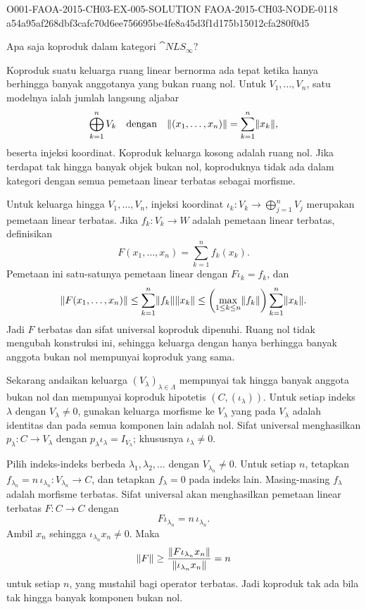 \begin{o001solution}
  {O001-FAOA-2015-CH03-EX-005-SOLUTION}
  {FAOA-2015-CH03-NODE-0118}
  {a54a95af268dbf3cafc70d6ee756695be4fe8a45d3f1d175b15012cfa280f0d5}
\begin{o001statement}
Apa saja koproduk dalam kategori $\cat{NLS_{\boldsymbol\infty}}$?
\end{o001statement}
\begin{o001answer}
Koproduk suatu keluarga ruang linear bernorma ada tepat ketika hanya
berhingga banyak anggotanya yang bukan ruang nol. Untuk
$V_1,\ldots,V_n$, satu modelnya ialah jumlah langsung aljabar
\[
\bigoplus_{k=1}^nV_k
\quad\text{dengan}\quad
\lVert(x_1,\ldots,x_n)\rVert=\sum_{k=1}^n\lVert x_k\rVert,
\]
beserta injeksi koordinat. Koproduk keluarga kosong adalah ruang nol.
Jika terdapat tak hingga banyak objek bukan nol, koproduknya tidak ada dalam
kategori dengan semua pemetaan linear terbatas sebagai morfisme.
\end{o001answer}
\begin{o001proof}
Untuk keluarga hingga $V_1,\ldots,V_n$, injeksi koordinat
$\iota_k\colon V_k\to\bigoplus_{j=1}^nV_j$ merupakan pemetaan linear
terbatas. Jika $f_k\colon V_k\to W$ adalah pemetaan linear terbatas,
definisikan
\[
F(x_1,\ldots,x_n)=\sum_{k=1}^nf_k(x_k).
\]
Pemetaan ini satu-satunya pemetaan linear dengan $F\iota_k=f_k$, dan
\[
\lVert F(x_1,\ldots,x_n)\rVert
\le\sum_{k=1}^n\lVert f_k\rVert\lVert x_k\rVert
\le\left(\max_{1\le k\le n}\lVert f_k\rVert\right)
   \sum_{k=1}^n\lVert x_k\rVert.
\]
Jadi $F$ terbatas dan sifat universal koproduk dipenuhi. Ruang nol tidak
mengubah konstruksi ini, sehingga keluarga dengan hanya berhingga banyak
anggota bukan nol mempunyai koproduk yang sama.

Sekarang andaikan keluarga $(V_\lambda)_{\lambda\in\Lambda}$ mempunyai tak
hingga banyak anggota bukan nol dan mempunyai koproduk hipotetis
$(C,(\iota_\lambda))$. Untuk setiap indeks $\lambda$ dengan
$V_\lambda\ne0$, gunakan keluarga morfisme ke $V_\lambda$ yang pada
$V_\lambda$ adalah identitas dan pada semua komponen lain adalah nol.
Sifat universal menghasilkan $p_\lambda\colon C\to V_\lambda$ dengan
$p_\lambda\iota_\lambda=I_{V_\lambda}$; khususnya
$\iota_\lambda\ne0$.

Pilih indeks-indeks berbeda $\lambda_1,\lambda_2,\ldots$ dengan
$V_{\lambda_n}\ne0$. Untuk setiap $n$, tetapkan
$f_{\lambda_n}=n\,\iota_{\lambda_n}\colon V_{\lambda_n}\to C$, dan tetapkan
$f_\lambda=0$ pada indeks lain. Masing-masing $f_\lambda$ adalah morfisme
terbatas. Sifat universal akan menghasilkan pemetaan linear terbatas
$F\colon C\to C$ dengan
\[
F\iota_{\lambda_n}=n\,\iota_{\lambda_n}.
\]
Ambil $x_n$ sehingga $\iota_{\lambda_n}x_n\ne0$. Maka
\[
\lVert F\rVert\ge
\frac{\lVert F\iota_{\lambda_n}x_n\rVert}
     {\lVert\iota_{\lambda_n}x_n\rVert}
=n
\]
untuk setiap $n$, yang mustahil bagi operator terbatas. Jadi koproduk tak
ada bila tak hingga banyak komponen bukan nol.
\end{o001proof}
\end{o001solution}

